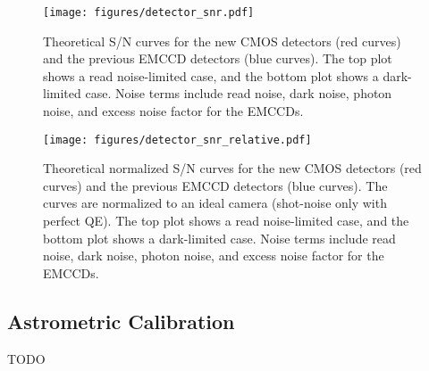 \begin{figure}
    \centering
    \texttt{[image: figures/detector\_snr.pdf]}
    \caption{Theoretical S/N curves for the new CMOS detectors (red curves) and the previous EMCCD detectors (blue curves). The top plot shows a read noise-limited case, and the bottom plot shows a dark-limited case. Noise terms include read noise, dark noise, photon noise, and excess noise factor for the EMCCDs.\label{fig:detector_snr}}
\end{figure}


\begin{figure}
    \centering
    \texttt{[image: figures/detector\_snr\_relative.pdf]}
    \caption{Theoretical normalized S/N curves for the new CMOS detectors (red curves) and the previous EMCCD detectors (blue curves). The curves are normalized to an ideal camera (shot-noise only with perfect QE). The top plot shows a read noise-limited case, and the bottom plot shows a dark-limited case. Noise terms include read noise, dark noise, photon noise, and excess noise factor for the EMCCDs.\label{fig:detector_snr_relative}}
\end{figure}


\subsection{Astrometric Calibration}

TODO